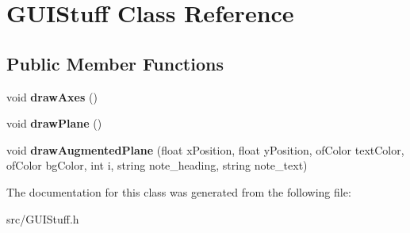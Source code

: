 \hypertarget{class_g_u_i_stuff}{\section{G\-U\-I\-Stuff Class Reference}
\label{class_g_u_i_stuff}
}
\subsection*{Public Member Functions}
\begin{DoxyCompactItemize}
\item 
\hypertarget{class_g_u_i_stuff_a38314054c4fc69ff9ade9fd528b8abf0}{void {\bfseries draw\-Axes} ()}\label{class_g_u_i_stuff_a38314054c4fc69ff9ade9fd528b8abf0}

\item 
\hypertarget{class_g_u_i_stuff_a94cf51ef7b6315e5c57f3e5ad88ecb21}{void {\bfseries draw\-Plane} ()}\label{class_g_u_i_stuff_a94cf51ef7b6315e5c57f3e5ad88ecb21}

\item 
\hypertarget{class_g_u_i_stuff_ae5b1868f2bdd019812391c7862349dac}{void {\bfseries draw\-Augmented\-Plane} (float x\-Position, float y\-Position, of\-Color text\-Color, of\-Color bg\-Color, int i, string note\-\_\-heading, string note\-\_\-text)}\label{class_g_u_i_stuff_ae5b1868f2bdd019812391c7862349dac}

\end{DoxyCompactItemize}


The documentation for this class was generated from the following file\-:\begin{DoxyCompactItemize}
\item 
src/G\-U\-I\-Stuff.\-h\end{DoxyCompactItemize}
